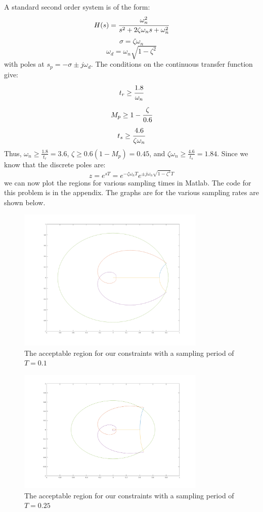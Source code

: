 \documentclass{article}
\begin{document}
A standard second order system is of the form:
\[H(s)=\cfrac{\omega_n^2}{s^2+2\zeta\omega_ns+\omega_n^2}\]
\[\sigma=\zeta\omega_n\]
\[\omega_d=\omega_n\sqrt{1-\zeta^2}\]
with poles at $s_p=-\sigma\pm j\omega_d$. The conditions on the continuous transfer function give:
\[t_r\geq \cfrac{1.8}{\omega_n}\]
\[M_p\geq 1-\cfrac{\zeta}{0.6}\]
\[t_s\geq \cfrac{4.6}{\zeta\omega_n}\]
Thus, $\omega_n\geq \frac{1.8}{t_r}=3.6$, $\zeta\geq 0.6(1-M_p)=0.45$, and $\zeta\omega_n\geq\frac{4.6}{t_s}=1.84$. Since we know that the discrete poles are:
\[z=e^{sT}=e^{-\zeta\omega_nT}e^{\pm j\omega_n\sqrt{1-\zeta^2}T}\]
we can now plot the regions for various sampling times in Matlab. The code for this problem is in the appendix. The graphs are for the various sampling rates are shown below.
\begin{figure}[H]
    \centering
    \includegraphics[width=0.8\textwidth]{Pr7_t1.png}
    \caption{The acceptable region for our constraints with a sampling period of $T=0.1$}
\end{figure}
\begin{figure}[H]
    \centering
    \includegraphics[width=0.8\textwidth]{PR7_t25.png}
    \caption{The acceptable region for our constraints with a sampling period of $T=0.25$}
\end{figure}
\end{document}
